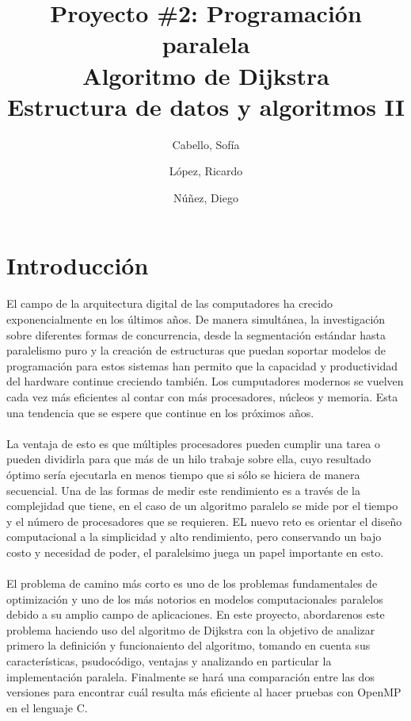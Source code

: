 \documentclass[11pt]{article}
\title{Proyecto \#2: Programación paralela\\
Algoritmo de Dijkstra\\
\large Estructura de datos y algoritmos II}
\author{Cabello, Sofía
\and López, Ricardo
\and Núñez, Diego}
\begin{document}
\maketitle{}

\section{Introducción}
El campo de la arquitectura digital de las computadores ha crecido exponencialmente en los últimos años. De manera simultánea, la investigación sobre diferentes formas de concurrencia, desde la segmentación estándar hasta paralelismo puro y la creación de estructuras que puedan soportar modelos de programación para estos sistemas han permito que la capacidad y productividad del hardware continue creciendo también. Los cumputadores modernos se vuelven cada vez más eficientes al contar con más procesadores, núcleos y memoria. Esta una tendencia que se espere que continue en los próximos años. 

\paragraph{}
La ventaja de esto es que múltiples procesadores pueden cumplir una tarea o pueden dividirla para que más de un hilo trabaje sobre ella, cuyo resultado óptimo sería ejecutarla en menos tiempo que si sólo se hiciera de manera secuencial. Una de las formas de medir este rendimiento es a través de la complejidad que tiene, en el caso de un algoritmo paralelo se mide por el tiempo y el número de procesadores que se requieren. EL nuevo reto es orientar el diseño computacional a la simplicidad y alto rendimiento, pero conservando un bajo costo y necesidad de poder, el paralelsimo juega un papel importante en esto. 

\paragraph{}
El problema de camino más corto es uno de los problemas fundamentales de optimización y uno de los más notorios en modelos computacionales paralelos debido a su amplio campo de aplicaciones. En este proyecto, abordarenos este problema haciendo uso del algoritmo de Dijkstra con la objetivo de analizar primero la definición y funcionaiento del algoritmo, tomando en cuenta sus características, psudocódigo, ventajas y analizando en particular la implementación paralela. Finalmente se hará una comparación entre las dos versiones para encontrar cuál resulta más eficiente al hacer pruebas con OpenMP en el lenguaje C. 
\end{document}

